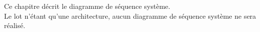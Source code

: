 
Ce chapitre décrit le diagramme de séquence système. \\

Le lot n'étant qu'une architecture, aucun diagramme de séquence système ne sera réalisé.